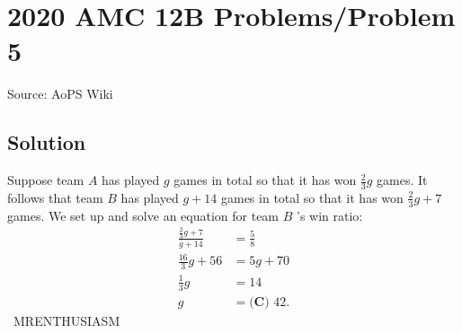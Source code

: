\documentclass[12pt]{article}
\begin{document}
\section*{{2020 AMC 12B Problems/Problem 5}}
Source: AoPS Wiki

\subsection*{Solution}
Suppose team $A$ has played $g$ games in total so that it has won $\frac23g$ games.
It follows that team $B$ has played $g+14$ games in total so that it has won $\frac23g+7$ games. We set up and solve an equation for team $B$ 's win ratio: \begin{align*} \frac{\frac23g+7}{g+14}&=\frac58 \\ \frac{16}{3}g+56&=5g+70 \\ \frac13g&=14 \\ g&=\boxed{\textbf{(C) } 42}. \end{align*} ~MRENTHUSIASM
\end{document}
